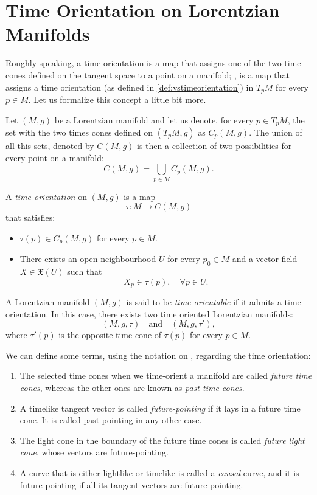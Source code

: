 \section{Time Orientation on Lorentzian Manifolds}

Roughly speaking, a time orientation is a map that assigns one of the two time cones defined on the tangent space to a point on a manifold; \ie, is a map that assigns a time orientation (as defined in \autoref{def:vstimeorientation}) in $T_pM$ for every $p \in M$. Let us formalize this concept a little bit more.

Let $(M,g)$ be a Lorentzian manifold and let us denote, for every $p \in T_pM$, the set with the two times cones defined on $(T_p M, g)$ as $C_p(M,g)$. The union of all this sets, denoted by $C(M,g)$ is then a collection of two-possibilities for every point on a manifold:
\[
C(M,g) = \bigcup_{p \in M} C_p(M,g).
\]

\begin{definition}
	A \emph{time orientation} on $(M,g)$ is a map
	\[
	\tau \colon M \to C(M,g)
	\]
	that satisfies:
	\begin{itemize}
		\item $\tau(p) \in C_p(M,g)$ for every $p \in M$.
		\item There exists an open neighbourhood $U$ for every $p_0 \in M$ and a vector field $X \in \mathfrak{X}(U)$ such that
		\[
		X_p \in \tau(p), \quad \forall p \in U.
		\]
	\end{itemize}
	
	A Lorentzian manifold $(M,g)$ is said to be \emph{time orientable} if it admits a time orientation. In this case, there exists two time oriented Lorentzian manifolds:
	\[
	(M,g,\tau) \quad\textrm{and}\quad (M,g,\tau'),
	\]
	where $\tau'(p)$ is the opposite time cone of $\tau(p)$ for every $p\in M$.
\end{definition}

We can define some terms, using the notation on \cite[p. 33]{oneill95}, regarding the time orientation:
\begin{enumerate}
	\item The selected time cones when we time-orient a manifold are called \emph{future time cones}, whereas the other ones are known as \emph{past time cones}.
	\item A timelike tangent vector is called \emph{future-pointing} if it lays in a future time cone. It is called past-pointing in any other case.
	\item The light cone in the boundary of the future time cones is called \emph{future light cone}, whose vectors are future-pointing.
	\item A curve that is either lightlike or timelike is called a \emph{causal} curve, and it is future-pointing if all its tangent vectors are future-pointing.
\end{enumerate}

